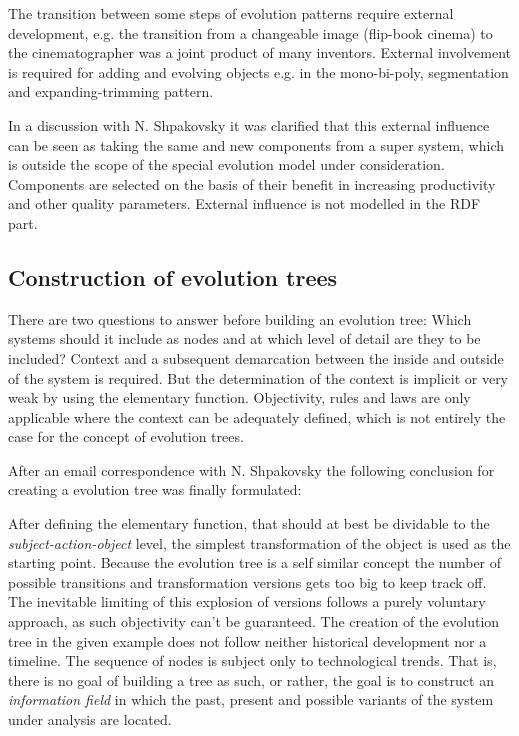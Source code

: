 \documentclass[11pt,a4paper]{article}
\begin{document}
The transition between some steps of evolution patterns require external
development, e.g. the transition from a changeable image (flip-book cinema) to
the cinematographer was a joint product of many inventors. External
involvement is required for adding and evolving objects e.g. in the
mono-bi-poly, segmentation and expanding-trimming pattern.

In a discussion with N. Shpakovsky it was clarified that this external
influence can be seen as taking the same and new components from a super
system, which is outside the scope of the special evolution model under
consideration. Components are selected on the basis of their benefit in
increasing productivity and other quality parameters. External influence is
not modelled in the RDF part.

\subsection{Construction of evolution trees}

There are two questions to answer before building an evolution tree: Which
systems should it include as nodes and at which level of detail are they to be
included?  Context and a subsequent demarcation between the inside and outside
of the system is required. But the determination of the context is implicit or
very weak by using the elementary function. Objectivity, rules and laws are
only applicable where the context can be adequately defined, which is not
entirely the case for the concept of evolution trees.

After an email correspondence with N. Shpakovsky the following conclusion for
creating a evolution tree was finally formulated:

After defining the elementary function, that should at best be dividable to the
\textit{subject-action-object} level, the simplest transformation of the
object is used as the starting point. Because the evolution tree is a self
similar concept the number of possible transitions and transformation versions
gets too big to keep track off. The inevitable limiting of this explosion of
versions follows a purely voluntary approach, as such objectivity can't be
guaranteed. The creation of the evolution tree in the given example does not
follow neither historical development nor a timeline. The sequence of nodes is
subject only to technological trends. That is, there is no goal of building a
tree as such, or rather, the goal is to construct an \emph{information field}
in which the past, present and possible variants of the system under analysis
are located.
\end{document}

